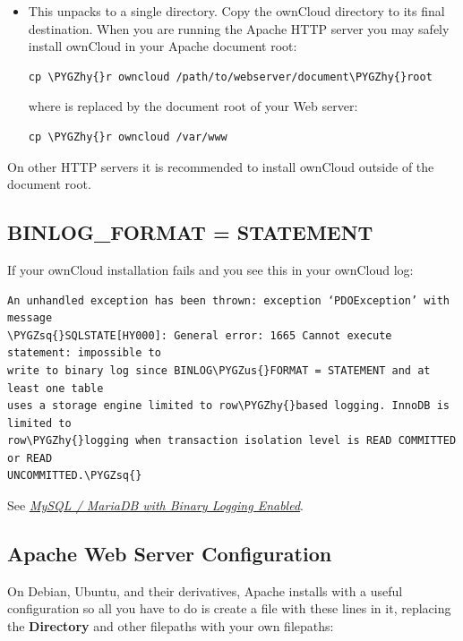 \documentclass[letterpaper,10pt,english]{sphinxmanual}
\def\PYGZus{\char`\_}
\def\PYGZhy{\char`\-}
\def\PYGZsq{\char`\'}
\renewcommand\PYGZsq{\textquotesingle}
\begin{document}
\begin{itemize}
\item {} 
This unpacks to a single  directory. Copy the ownCloud directory
to its final destination. When you are running the Apache HTTP server you may
safely install ownCloud in your Apache document root:

\begin{Verbatim}[commandchars=\\\{\}]
cp \PYGZhy{}r owncloud /path/to/webserver/document\PYGZhy{}root
\end{Verbatim}

where  is replaced by the
document root of your Web server:

\begin{Verbatim}[commandchars=\\\{\}]
cp \PYGZhy{}r owncloud /var/www
\end{Verbatim}

\end{itemize}

On other HTTP servers it is recommended to install ownCloud outside of the
document root.


\subsection{BINLOG\_FORMAT = STATEMENT}
\label{installation/source_installation:binlog-format-label}\label{installation/source_installation:binlog-format-statement}
If your ownCloud installation fails and you see this in your ownCloud log:

\begin{Verbatim}[commandchars=\\\{\}]
An unhandled exception has been thrown: exception ‘PDOException’ with message
\PYGZsq{}SQLSTATE[HY000]: General error: 1665 Cannot execute statement: impossible to
write to binary log since BINLOG\PYGZus{}FORMAT = STATEMENT and at least one table
uses a storage engine limited to row\PYGZhy{}based logging. InnoDB is limited to
row\PYGZhy{}logging when transaction isolation level is READ COMMITTED or READ
UNCOMMITTED.\PYGZsq{}
\end{Verbatim}

See {\hyperref[configuration_database/linux_database_configuration:db\string-binlog\string-label]{\emph{MySQL / MariaDB with Binary Logging Enabled}}}.


\subsection{Apache Web Server Configuration}
\label{installation/source_installation:apache-web-server-configuration}\label{installation/source_installation:apache-configuration-label}
On Debian, Ubuntu, and their derivatives, Apache installs with a useful
configuration so all you have to do is create a
 file with these lines in
it, replacing the \textbf{Directory} and other filepaths with your own filepaths:
\end{document}
